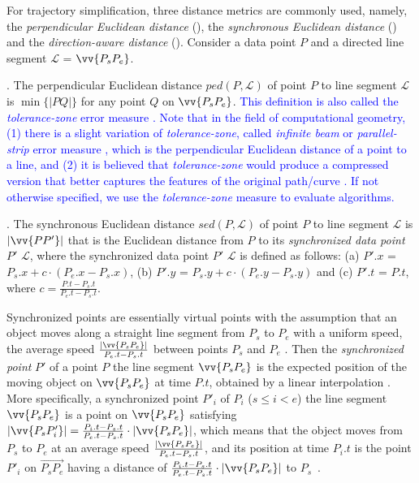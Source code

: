  For trajectory simplification, three distance metrics are commonly used, namely, the \emph{perpendicular Euclidean distance} (\ped), the \emph{synchronous Euclidean distance} \cite{Meratnia:Spatiotemporal} (\sed) and the \emph{direction-aware distance}\cite{Long:Direction, Zhang:Evaluation} (\dad).
%
Consider a data point $P$ and a directed line segment $\mathcal{L}$ = $\vv{P_{s}P_{e}}$.

. The perpendicular Euclidean distance $ped\left(P, \mathcal{L}\right)$ of point $P$ to line segment $\mathcal{L}$ is $\min\{|PQ|\}$ for any point $Q$ on $\vv{P_{s}P_{e}}$.
%
\textcolor{blue}{This definition is also called the \emph{tolerance-zone} error measure \cite{Daescu:metric,Barequet:3D,Chen:Space,Imai:Optimal,Melkman:Optimal}.}
\textcolor{blue}{Note that in the field of computational geometry, (1) there is a slight variation of \emph{tolerance-zone}, called \emph{infinite beam} or \emph{parallel-strip} error measure \cite{Daescu:metric,Chen:Space}, which is the perpendicular Euclidean distance of a point to a line, and (2) it is believed that \emph{tolerance-zone} would produce a compressed version that better captures the features of the original path/curve \cite{Daescu:metric,Barequet:3D,Chen:Space}. If not otherwise specified, we use the \emph{tolerance-zone} measure to evaluate algorithms.}
	
. The synchronous Euclidean distance $sed\left(P, \mathcal{L}\right)$ of point $P$ to line segment $\mathcal{L}$ is $|\vv{PP'}|$ that is the Euclidean distance from $P$ to its \textit{synchronized data point} $P'$ \wrt $\mathcal{L}$, where the synchronized data point $P'$ \wrt $\mathcal{L}$ is defined as follows:
(a) $P'.x$ = $P_s.x +  c\cdot\left(P_e.x - P_s.x\right)$,
(b) $P'.y$ = $P_s.y +  c\cdot\left(P_e.y - P_s.y\right)$ and
(c) $P'.t$ = $P.t$, where $c= \frac{P.t-P_s.t}{P_e.t-P_s.t}$.

{Synchronized points are essentially virtual points with the assumption that an object moves along a straight line segment from $P_s$ to $P_e$ with a uniform speed, \ie the average speed $\frac{|\vv{P_sP_e}|}{P_e.t-P_s.t}$ between points $P_s$ and $P_e$ \cite{Cao:Spatio,Lin:Cised}. Then the \emph{synchronized point} $P'$ of a point $P$ \wrt the line segment $\vv{P_sP_e}$ is the expected position of the moving object on $\vv{P_sP_e}$ at time $P.t$, obtained by a linear interpolation \cite{Cao:Spatio}. More specifically, a synchronized point $P'_i$ of $P_i$ ($s\le i < e$) \wrt the line segment $\vv{P_sP_e}$ is a point on $\vv{P_sP_{e}}$ satisfying ${|\vv{P_sP'_i}|} = \frac{P_i.t - P_s.t}{P_e.t - P_s.t}\cdot {|\vv{P_sP_e}|}$, which means that the object moves from $P_s$ to $P_e$ at an average speed $\frac{|\vv{P_sP_e}|}{P_e.t-P_s.t}$, and its position at time $P_i.t$ is the point $P'_i$ on $\overrightarrow{P_sP_{e}}$ having a distance of $\frac{P_i.t - P_s.t}{P_e.t - P_s.t}\cdot|\vv{P_sP_e}|$ to $P_s$~\cite{Cao:Spatio, Lin:Cised,Meratnia:Spatiotemporal, Chen:Fast, Zhang:Evaluation}.}

